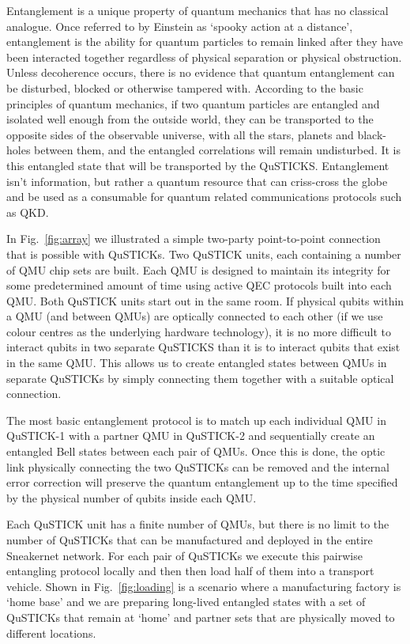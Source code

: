 \documentclass[twocolumn, aps, rmp, amsmath, amssymb, nofootinbib, superscriptaddress, longbibliography, floatfix, table-of-contents, eqsecnum]{revtex4-2}
\begin{document}
Entanglement is a unique property of quantum mechanics that has no classical analogue. Once referred to by Einstein as `spooky action at a distance', entanglement is the ability for quantum particles to remain linked after they have been interacted together regardless of physical separation or physical obstruction. Unless decoherence occurs, there is no evidence that quantum entanglement can be disturbed, blocked or otherwise tampered with. According to the basic principles of quantum mechanics, if two quantum particles are entangled and isolated well enough from the outside world, they can be transported to the opposite sides of the observable universe, with all the stars, planets and black-holes between them, and the entangled correlations will remain undisturbed. It is this entangled state that will be transported by the QuSTICKS. Entanglement isn't information, but rather a quantum resource that can criss-cross the globe and be used as a consumable for quantum related communications protocols such as QKD. 

In Fig.~\ref{fig:array} we illustrated a simple two-party point-to-point connection that is possible with QuSTICKs. Two QuSTICK units, each containing a number of QMU chip sets are built. Each QMU is designed to maintain its integrity for some predetermined amount of time using active QEC protocols built into each QMU. Both QuSTICK units start out in the same room. If physical qubits within a QMU (and between QMUs) are optically connected to each other (if we use colour centres as the underlying hardware technology), it is no more difficult to interact qubits in two separate QuSTICKS than it is to interact qubits that exist in the same QMU. This allows us to create entangled states between QMUs in separate QuSTICKs by simply connecting them together with a suitable optical connection. 

The most basic entanglement protocol is to match up each individual QMU in QuSTICK-1 with a partner QMU in QuSTICK-2 and sequentially create an entangled Bell states between each pair of QMUs. Once this is done, the optic link physically connecting the two QuSTICKs can be removed and the internal error correction will preserve the quantum entanglement up to the time specified by the physical number of qubits inside each QMU.

Each QuSTICK unit has a finite number of QMUs, but there is no limit to the number of QuSTICKs that can be manufactured and deployed in the entire Sneakernet network. For each pair of QuSTICKs we execute this pairwise entangling protocol locally and then then load half of them into a transport vehicle. Shown in Fig.~\ref{fig:loading} is a scenario where a manufacturing factory is `home base' and we are preparing long-lived entangled states with a set of QuSTICKs that remain at `home' and partner sets that are physically moved to different locations. 
\end{document}

